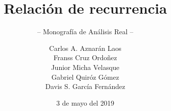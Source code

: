 \documentclass[graybox,envcountchap,sectrefs]{svmono}
\date{3 de mayo del 2019}
\begin{document}
\author{Carlos A. Aznarán Laos\\
Franss Cruz Ordoñez\\
Junior Micha Velasque\\
Gabriel Quiróz Gómez\\
Davis S. García Fernández}
\title{Relación de recurrencia}
\subtitle{-- Monografía de Análisis Real --}
\maketitle

\frontmatter%





\tableofcontents



\mainmatter%

%




%



%
%


\backmatter%
%
%

\printindex

\end{document}
